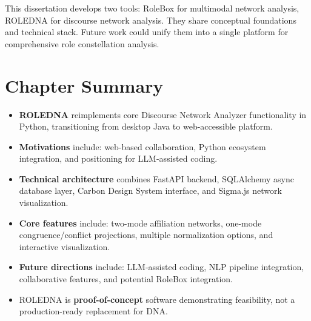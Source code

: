 \documentclass[../main.tex]{subfiles}
\begin{document}
\begin{insightbox}
This dissertation develops two tools: RoleBox for multimodal network analysis, ROLEDNA for discourse network analysis. They share conceptual foundations and technical stack. Future work could unify them into a single platform for comprehensive role constellation analysis.
\end{insightbox}


\section*{Chapter Summary}

\begin{summarybox}
\begin{itemize}[leftmargin=*, itemsep=0.3em]
\item \textbf{ROLEDNA} reimplements core Discourse Network Analyzer functionality in Python, transitioning from desktop Java to web-accessible platform.

\item \textbf{Motivations} include: web-based collaboration, Python ecosystem integration, and positioning for LLM-assisted coding.

\item \textbf{Technical architecture} combines FastAPI backend, SQLAlchemy async database layer, Carbon Design System interface, and Sigma.js network visualization.

\item \textbf{Core features} include: two-mode affiliation networks, one-mode congruence/conflict projections, multiple normalization options, and interactive visualization.

\item \textbf{Future directions} include: LLM-assisted coding, NLP pipeline integration, collaborative features, and potential RoleBox integration.

\item ROLEDNA is \textbf{proof-of-concept} software demonstrating feasibility, not a production-ready replacement for DNA.
\end{itemize}
\end{summarybox}

\vspace{1cm}

\begin{center}
\end{center}

\closeintermezzo
\end{document}

